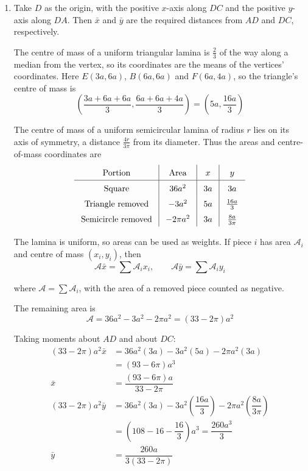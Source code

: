 \documentclass[leqno]{article}
\begin{document}
\begin{enumerate}[
  label=\textbf{\arabic*.},
  leftmargin=*,
  topsep=0pt,
  partopsep=0pt,
  parsep=0pt
]
\vspace*{10pt}

\begin{djsSolution}
\begin{enumerate}[label=\textbf{(\alph*)}, start=1]
\item
Take \(D\) as the origin, with the positive \(x\)-axis along \(DC\) and the positive \(y\)-axis along \(DA\). Then \(\bar{x}\) and \(\bar{y}\) are the required distances from \(AD\) and \(DC\), respectively.

The centre of mass of a uniform triangular lamina is \(\frac23\) of the way along a median from the vertex, so its coordinates are the means of the vertices' coordinates. Here \(E(3a,6a)\), \(B(6a,6a)\) and \(F(6a,4a)\), so the triangle's centre of mass is
\[
\left(\dfrac{3a+6a+6a}{3},\dfrac{6a+6a+4a}{3}\right)
=\left(5a,\dfrac{16a}{3}\right)
\]

The centre of mass of a uniform semicircular lamina of radius \(r\) lies on its axis of symmetry, a distance \(\frac{4r}{3\pi}\) from its diameter. Thus the areas and centre-of-mass coordinates are
\[
\renewcommand{\arraystretch}{1.5}
\setlength{\arraycolsep}{8pt}
\begin{array}{c|c|c|c}
\text{Portion} & \text{Area} & x & y\\ \hline
\text{Square} & 36a^2 & 3a & 3a\\
\text{Triangle removed} & -3a^2 & 5a & \tfrac{16a}{3}\\
\text{Semicircle removed} & -2\pi a^2 & 3a & \tfrac{8a}{3\pi}
\end{array}
\]

The lamina is uniform, so areas can be used as weights. If piece \(i\) has area \(\mathcal{A}_i\) and centre of mass \((x_i,y_i)\), then
\[
\mathcal{A}\bar{x}=\sum\mathcal{A}_ix_i,\qquad \mathcal{A}\bar{y}=\sum\mathcal{A}_iy_i
\]

where \(\mathcal{A}=\sum\mathcal{A}_i\), with the area of a removed piece counted as negative.

The remaining area is
\[
\mathcal{A}=36a^2-3a^2-2\pi a^2=(33-2\pi)a^2
\]

Taking moments about \(AD\) and about \(DC\):
\begin{align*}
(33-2\pi)a^2\bar{x}
&=36a^2(3a)-3a^2(5a)-2\pi a^2(3a)\\
&=(93-6\pi)a^3\\
\bar{x}&=\dfrac{(93-6\pi)a}{33-2\pi}\\
(33-2\pi)a^2\bar{y}
&=36a^2(3a)-3a^2\left(\dfrac{16a}{3}\right)
-2\pi a^2\left(\dfrac{8a}{3\pi}\right)\\
&=\left(108-16-\dfrac{16}{3}\right)a^3
=\dfrac{260a^3}{3}\\
\bar{y}&=\dfrac{260a}{3(33-2\pi)}
\end{align*}


\end{enumerate}
\end{djsSolution}
\end{enumerate}
\end{document}
